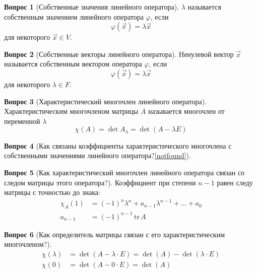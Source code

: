 \documentclass[a4paper,11pt]{article}
\theoremstyle{remark}
\theoremstyle{definition}
\newtheorem{question}{Вопрос}
\begin{document}
\begin{question}[Собственные значения линейного оператора]
\(\lambda\) называется собственным значением линейного оператора \(\varphi\), если
\begin{equation*}
	\varphi(\vec{x}) = \lambda\vec{x}
\end{equation*}
для некоторого \(\vec{x} \in V\).
\end{question}


\begin{question}[Собственные векторы линейного оператора]
Ненулевой вектор \(\vec{x}\) называется собственным вектором оператора \(\varphi\), если
\begin{equation*}
	\varphi(\vec{x}) = \lambda\vec{x}
\end{equation*}
для некоторого \(\lambda \in F\).
\end{question}


\begin{question}[Характеристический многочлен линейного оператора]
Характеристическим многочленом матрицы \(A\) называется многочлен от переменной \(\lambda\)
\begin{equation*}
	\chi(A) = \det A_{\lambda} = \det (A - \lambda{}E)
\end{equation*}
\end{question}


\begin{question}[Как связаны коэффициенты характеристического многочлена с собственными значениями линейного оператора?\cref{notfound}]
\end{question}


\begin{question}[Как характеристический многочлен линейного оператора связан со следом матрицы этого оператора?]
Коэффициент при степени \(n-1\) равен следу матрицы с точностью до знака:
\begin{align*}
	\chi_A(1) &= (-1)^n\lambda^n + a_{n-1}\lambda^{n-1} + \dots + a_0 \\
	a_{n-1} &= (-1)^{n-1}\,\mathrm{tr}\,A
\end{align*}
\end{question}


\begin{question}[Как определитель матрицы связан с его характеристическим многочленом?]
\begin{align*}
	\chi(\lambda) &= \det (A - \lambda \cdot E) = \det (A) - \det (\lambda \cdot E) \\
	\chi(0) &= \det (A - 0 \cdot E) = \det (A)	
\end{align*}
\end{question}
\end{document}
